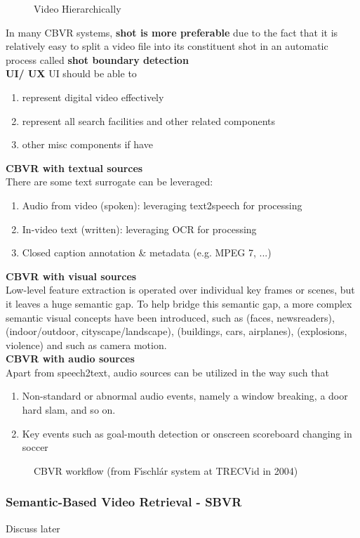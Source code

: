 \begin{figure}[h!]
	\centering
	\caption{Video Hierarchically}
\end{figure}

\noindent In many CBVR systems, \textbf{shot is more preferable} due to the fact that it is relatively easy to split a video file into its constituent shot in an automatic process called \textbf{shot boundary detection}\\

\noindent\textbf{UI/ UX}\vspace{-2.5mm}
UI should be able to
\begin{enumerate}
	\item represent digital video effectively
	\item represent all search facilities and other related components
	\item other misc components if have
\end{enumerate}

\noindent\textbf{CBVR with textual sources}\\
There are some text surrogate can be leveraged:\vspace{-2.5mm}
\begin{enumerate}
	\item Audio from video (spoken): leveraging text2speech for processing
	\item In-video text (written): leveraging OCR for processing
	\item Closed caption annotation \& metadata (e.g. MPEG 7, ...)
\end{enumerate}

\noindent\textbf{CBVR with visual sources}\\
\indent Low-level feature extraction is operated over individual key frames or scenes, but it leaves a huge semantic gap. To help bridge this semantic gap, a more complex semantic visual concepts have been introduced, such as  (faces, newsreaders),  (indoor/outdoor, cityscape/landscape),  (buildings, cars, airplanes),  (explosions, violence) and  such as camera motion.\\

\noindent\textbf{CBVR with audio sources}\\
\noindent Apart from speech2text, audio sources can be utilized in the way such that\vspace{-2.5mm}
\begin{enumerate}
	\item Non-standard or abnormal audio events, namely a window breaking, a door hard slam, and so on.
	
	\item Key events such as goal-mouth detection or onscreen scoreboard changing in soccer
\end{enumerate}
\begin{figure}[h!]
	\centering
	\caption{CBVR workflow (from Fı́schlár system at
		TRECVid in 2004)}
\end{figure}


\subsubsection{Semantic-Based Video Retrieval - SBVR} %
Discuss later


